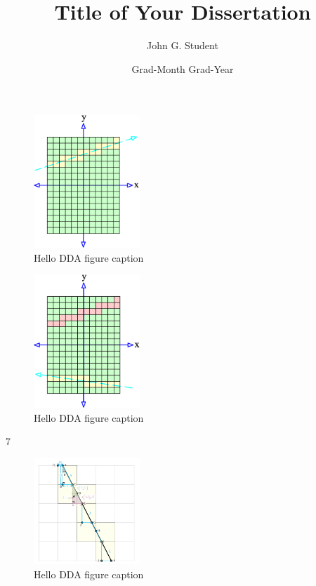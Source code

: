 \documentclass{thesis}
\title{Title of Your Dissertation}                                      %
\author{John G. Student}                                                %
\date{Grad-Month Grad-Year}                                             %
\begin{document}
	

	\begin{figure}
	  \centering
	  \includegraphics[width=4cm]{Space_Carving_1.png}
	  \caption{Hello DDA figure caption }\label{fig:DDA}
	\end{figure}
	\begin{figure}
	  \centering
	  \includegraphics[width=4cm]{Space_Carving_2.png}
	  \caption{Hello DDA figure caption}\label{fig:DDA}
	\end{figure}
7

	\begin{figure}
	  \centering
	  \includegraphics[width=4cm]{DDA.png}
	  \caption{Hello DDA figure caption}\label{fig:DDA}
	\end{figure}



\end{document}
